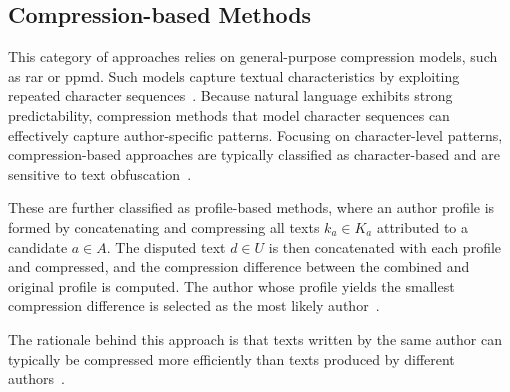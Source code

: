 \subsection{Compression-based Methods}
\label{subsec:compression_based}

This category of approaches relies on general-purpose compression models, such as \ac{rar} or \ac{ppmd}. %
Such models capture textual characteristics by exploiting repeated character sequences~\citep{stamatatos_survey_2009,neal_surveying_2018}. 
Because natural language exhibits strong predictability, compression methods that model character sequences can effectively capture author-specific patterns.
Focusing on character-level patterns, compression-based approaches are typically classified as character-based and are sensitive to text obfuscation~\citep{bevendorff_divergence_based_2020}.

These are further classified as profile-based methods, where an author profile is formed by concatenating and compressing all texts $k_a \in K_a$ attributed to a candidate $a \in A$. 
The disputed text $d \in U$ is then concatenated with each profile and compressed, and the compression difference between the combined and original profile is computed. 
The author whose profile yields the smallest compression difference is selected as the most likely author~\citep{stamatatos_survey_2009,elmanarelbouanani_authorship_2014,neal_surveying_2018}.

The rationale behind this approach is that texts written by the same author can typically be compressed more efficiently than texts produced by different authors~\citep{stamatatos_survey_2009,elmanarelbouanani_authorship_2014}.


